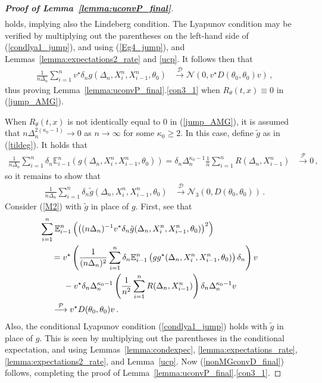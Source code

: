 \documentclass[11pt,a4paper]{article}
\newcommand{\xtl}{{X^n_{i-1}}}
\newcommand{\xtr}{X^n_i}
\newcommand{\thetan}{{\theta_0}}
\newcommand{\EE}{{\mathbb E}}
\newcommand{\dd}{{\mathcal{D}}}
\newcommand{\nn}{{\mathcal{N}}}
\newcommand{\pp}{{\mathcal{P}}}
\numberwithin{equation}{section}
\numberwithin{theorem}{section}
\begin{document}
\begin{proof}[\textbf{Proof of Lemma~\ref{lemma:uconvP_final}}]
\begin{align}
\label{condlya1_jump}
\end{align}
%
holds, implying also the Lindeberg condition. The Lyapunov condition may be verified by
  multiplying out the parentheses on the left-hand side of (\ref{condlya1_jump}), and using
  (\ref{Eg4_jump}), and Lemmas~\ref{lemma:expectations2_rate} and \ref{ucp}. It follows then that 
\begin{align*}
\frac{1}{n\Delta_n}\sum_{i=1}^n v^\star \delta_n g(\Delta_n,\xtr,\xtl,
\thetan) &\overset{\dd}{\longrightarrow}\nn\left(0,v^\star  D(\thetan,\thetan) v\right)\,,
\end{align*}
%
thus proving Lemma~\ref{lemma:uconvP_final}.\ref{con3_1} when $R_\theta(t,x) \equiv 0$ in (\ref{jump_AMG}).
\medskip

When $R_\theta(t,x)$ is not identically equal to $0$ in (\ref{jump_AMG}),
it is assumed that $n\Delta_n^{2({\kappa_0}-1)}
\to 0$ as $n\to \infty$ for some ${\kappa_0} \geq 2$. In this case,
define $\tilde g$ as in (\ref{tildeg}). It holds that
\begin{align*}
\frac{1}{n\Delta_n}\sum_{i=1}^n \delta_n\EE_{i-1}^n \left( g(\Delta_n,\xtr,\xtl,
  \thetan)\right) = \delta_n\Delta_n^{{\kappa_0}-1}\frac{1}{n} \sum_{i=1}^n
                             R(\Delta_n,\xtl)&\overset{\pp}{\longrightarrow} 0\,,
\end{align*}
%
so it remains to show that
\begin{align}
\frac{1}{n\Delta_n}\sum_{i=1}^n \delta_n\tilde{g}(\Delta_n,\xtr,\xtl,
\thetan)&\overset{\dd}{\longrightarrow} \nn_3(0,D(\thetan, \thetan))\,.
\label{nonMGconvD_final}
\end{align}
%
Consider
(\ref{M2}) with $\tilde g$ in place of $g$. First, see that
\begin{align*}
&\hspace{-5mm} \sum_{i=1}^n
\EE^n_{i-1}\left(\left((n\Delta_n)^{-1}  v^\star \delta_n \tilde{g}(\Delta_n, \xtr, \xtl, \thetan)\right)^2\right)\\
&= v^\star \left(\frac{1}{(n\Delta_n)^2}\sum_{i=1}^n \delta_n 
\EE^n_{i-1}\left(gg^\star (\Delta_n, \xtr, \xtl, \thetan)\right)
  \delta_n\right)v\\
&\hspace{5mm} - v^\star \delta_n\Delta_n^{{\kappa_0}-1} \left(\frac{1}{n^2}\sum_{i=1}^n 
R(\Delta_n,\xtl)\right)\delta_n\Delta_n^{{\kappa_0}-1} v\\
&\overset{\pp}{\longrightarrow} v^\star  D(\thetan, \thetan)v\,.
\end{align*}
%
Also, the conditional Lyapunov condition (\ref{condlya1_jump}) holds
with $\tilde g$ in place of $g$. This is  seen by multiplying out the
  parentheses in the conditional expectation, and using Lemmas~\ref{lemma:condexpec},
\ref{lemma:expectations_rate}, \ref{lemma:expectations2_rate}, and Lemma~\ref{ucp}. Now (\ref{nonMGconvD_final}) follows, completing the proof of Lemma~\ref{lemma:uconvP_final}.\ref{con3_1}.
\end{proof}
\end{document}
